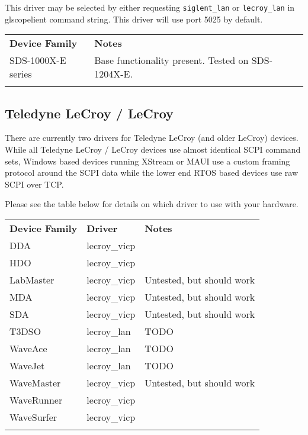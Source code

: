 This driver may be selected by either requesting \texttt{siglent\_lan} or \texttt{lecroy\_lan} in glscopelient command
string. This driver will use port 5025 by default. \\

\begin{tabularx}{16cm}{llX}
\thickhline
\textbf{Device Family} & \textbf{Notes} \\
\thickhline
SDS-1000X-E series & Base functionality present. Tested on SDS-1204X-E. \\
\thickhline
\end{tabularx}

\subsection{Teledyne LeCroy / LeCroy}

There are currently two drivers for Teledyne LeCroy (and older LeCroy) devices. While all Teledyne LeCroy / LeCroy
devices use almost identical SCPI command sets, Windows based devices running XStream or MAUI use a custom framing
protocol around the SCPI data while the lower end RTOS based devices use raw SCPI over TCP.

Please see the table below for details on which driver to use with  your hardware.

\begin{tabularx}{16cm}{llX}
\thickhline
\textbf{Device Family} & \textbf{Driver} & \textbf{Notes} \\
\thickhline
DDA & lecroy\_vicp & \\
\thickhline
HDO & lecroy\_vicp & \\
\thickhline
LabMaster & lecroy\_vicp & Untested, but should work\\
\thickhline
MDA & lecroy\_vicp &  Untested, but should work\\
\thickhline
SDA & lecroy\_vicp &  Untested, but should work\\
\thickhline
T3DSO & lecroy\_lan & TODO \\
\thickhline
WaveAce & lecroy\_lan & TODO \\
\thickhline
WaveJet & lecroy\_lan & TODO \\
\thickhline
WaveMaster & lecroy\_vicp & Untested, but should work \\
\thickhline
WaveRunner & lecroy\_vicp &  \\
\thickhline
WaveSurfer & lecroy\_vicp &  \\
\thickhline
\end{tabularx}

